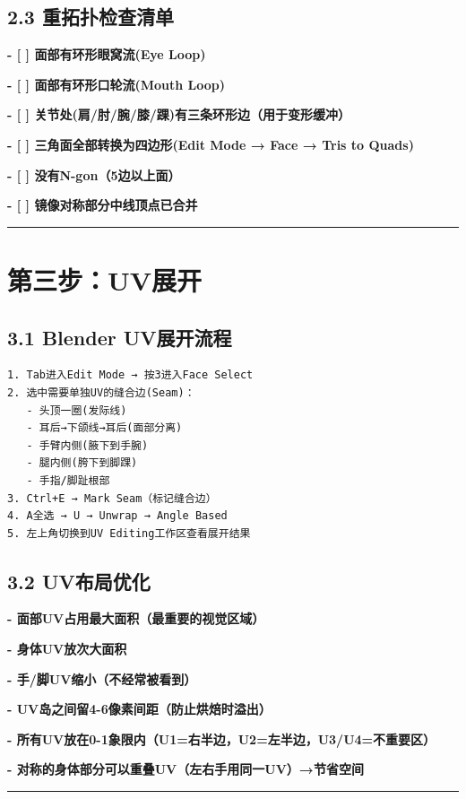 \documentclass[12pt,a4paper,openany]{ctexbook}
\begin{document}
\subsection*{2.3 重拓扑检查清单}


\textbf{- [ ] 面部有环形眼窝流(Eye Loop)}

\textbf{- [ ] 面部有环形口轮流(Mouth Loop)}

\textbf{- [ ] 关节处(肩/肘/腕/膝/踝)有三条环形边（用于变形缓冲）}

\textbf{- [ ] 三角面全部转换为四边形(Edit Mode → Face → Tris to Quads)}

\textbf{- [ ] 没有N-gon（5边以上面）}

\textbf{- [ ] 镜像对称部分中线顶点已合并}


\bigskip\hrule\bigskip


\section*{第三步：UV展开}


\subsection*{3.1 Blender UV展开流程}


\begin{verbatim}
1. Tab进入Edit Mode → 按3进入Face Select
2. 选中需要单独UV的缝合边(Seam)：
   - 头顶一圈(发际线)
   - 耳后→下颌线→耳后(面部分离)
   - 手臂内侧(腋下到手腕)
   - 腿内侧(胯下到脚踝)
   - 手指/脚趾根部
3. Ctrl+E → Mark Seam（标记缝合边）
4. A全选 → U → Unwrap → Angle Based
5. 左上角切换到UV Editing工作区查看展开结果
\end{verbatim}


\subsection*{3.2 UV布局优化}


\textbf{- 面部UV占用最大面积（最重要的视觉区域）}

\textbf{- 身体UV放次大面积}

\textbf{- 手/脚UV缩小（不经常被看到）}

\textbf{- UV岛之间留4-6像素间距（防止烘焙时溢出）}

\textbf{- 所有UV放在0-1象限内（U1=右半边，U2=左半边，U3/U4=不重要区）}

\textbf{- 对称的身体部分可以重叠UV（左右手用同一UV）→节省空间}


\bigskip\hrule\bigskip
\end{document}

